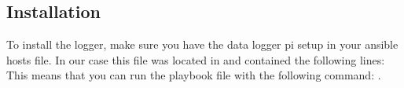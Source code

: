 \subsection{Installation} \label{linstall}
To install the logger, make sure you have the data logger pi setup in your ansible hosts file. In our case this file was located in   and contained the following lines:\newline 
 \newline
This means that you can run the playbook file  with the following command: .
